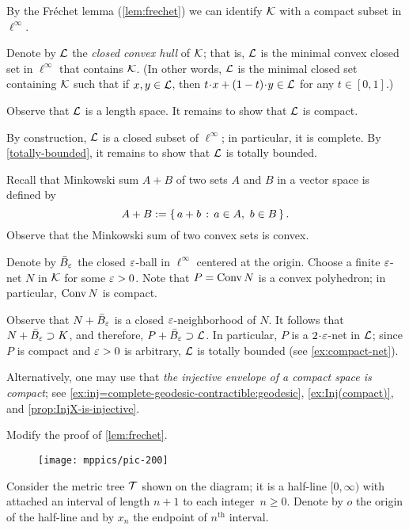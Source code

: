\setcounter{eqtn}{0}

By the Fréchet lemma (\ref{lem:frechet}) we can identify $\mathcal{K}$ with a compact subset in $\ell^\infty$.

Denote by $\mathcal{L}$ the \emph{closed convex hull} of $\mathcal{K}$;
that is, $\mathcal{L}$ is the minimal convex closed set in $\ell^\infty$ that contains $\mathcal{K}$.
(In other words, $\mathcal{L}$ is the minimal closed set containing $\mathcal{K}$ such that if $x,y\in \mathcal{L}$, then 
$t\cdot x+(1-t)\cdot y\in \spc{L}$ for any $t\in[0,1]$.)

Observe that $\mathcal{L}$ is a length space.
It remains to show that $\mathcal{L}$ is compact.

By construction, $\mathcal{L}$ is a closed subset of $\ell^\infty$; in particular, it is complete.
By \ref{totally-bounded}, it remains to show that $\mathcal{L}$ is totally bounded.

Recall that Minkowski sum $A + B$ of two sets $A$ and $B$ in a vector space is defined by
\[A + B 
\mathrel{:=}
\left\{\,{a+b}\,:\,{a\in A,\ b\in B}\,\right\}.\]
Observe that the Minkowski sum of two convex sets is convex.

Denote by $\bar B_\varepsilon$ the closed $\varepsilon$-ball in $\ell^\infty$ centered at the origin.
Choose a finite $\varepsilon$-net $N$ in $\mathcal{K}$ for some $\varepsilon>0$.
Note that $P=\mathop{\rm Conv}\nolimits N$ is a convex polyhedron; in particular, $\mathop{\rm Conv}\nolimits N$ is compact.

Observe that $N+\bar B_\varepsilon$ is a closed $\varepsilon$-neighborhood of $N$.
It follows that $N+\bar B_\varepsilon\supset K$, and therefore, $P+\bar B_\varepsilon\supset \mathcal{L}$.
In particular, $P$ is a $2\cdot\eps$-net in $\mathcal{L}$;
since $P$ is compact and $\varepsilon>0$ is arbitrary, $\mathcal{L}$ is totally bounded (see \ref{ex:compact-net}).

Alternatively, one may use that \textit{the injective envelope of a compact space is compact}; see \ref{ex:inj=complete-geodesic-contractible:geodesic}, \ref{ex:Inj(compact)}, and \ref{prop:InjX-is-injective}.

Modify the proof of \ref{lem:frechet}.

\begin{wrapfigure}{r}{23mm}
\vskip-6mm
\centering
\texttt{[image: mppics/pic-200]}
\end{wrapfigure}

Consider the metric tree $\mathcal{T}$ shown on the diagram;
it is a half-line $[0,\infty)$ with attached an interval of length $n+1$ to each integer~$n\ge 0$.
Denote by $o$ the origin of the half-line
and by $x_n$ the endpoint of $n^{\text{th}}$ interval.

